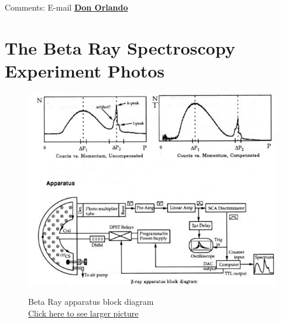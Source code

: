\documentclass{../lab}
\begin{document}
Comments: E-mail \href{\MailDonOrlando}{\textbf{Don Orlando}}

\section{The Beta Ray Spectroscopy Experiment Photos}

\begin{figure}[!h]
  \href{http://experimentationlab.berkeley.edu/sites/default/files/images/Bra_1.jpg}{\includegraphics[width=\linewidth,keepaspectratio]{images/Bra_1.jpg}}
  \caption{Beta Ray apparatus block diagram \\ \href{http://experimentationlab.berkeley.edu/sites/default/files/images/Bra_1.jpg}{Click here to see larger picture}}
  \label{fig:BRayBlock}
\endminipage\hfill
{}

\end{figure}
\end{document}
